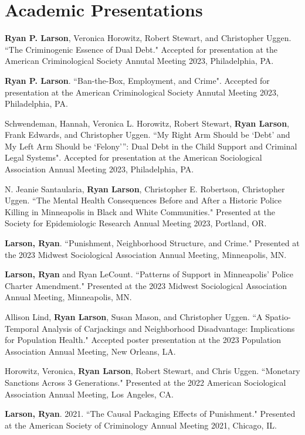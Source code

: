 \documentclass[letterpaper]{article}
\renewenvironment{itemize}{
  \begin{list}{}{
    \setlength{\leftmargin}{1.5em}
  }
}{
  \end{list}
}
\begin{document}
\section*{\textbf{Academic Presentations}}
\begin{itemize}
\item \textbf{Ryan P. Larson}, Veronica Horowitz, Robert Stewart, and Christopher Uggen. ``The Criminogenic Essence of Dual Debt." Accepted for presentation at the American Criminological Society Annutal Meeting 2023, Philadelphia, PA. 
\item \textbf{Ryan P. Larson}. ``Ban-the-Box, Employment, and Crime". Accepted for presentation at the American Criminological Society Annutal Meeting 2023, Philadelphia, PA. 
\item Schwendeman, Hannah, Veronica L. Horowitz, Robert Stewart, \textbf{Ryan Larson}, Frank Edwards, and Christopher Uggen. ``My Right Arm Should be ‘Debt’ and My Left Arm Should be ‘Felony’”:
Dual Debt in the Child Support and Criminal Legal Systems". Accepted for presentation at the American Sociological Association Annual Meeting 2023, Philadelphia, PA. 
\item N. Jeanie Santaularia, \textbf{Ryan Larson}, Christopher E. Robertson, Christopher Uggen. ``The Mental Health Consequences Before and After a Historic Police Killing in Minneapolis in Black and White Communities." Presented at the Society for Epidemiologic Research Annual Meeting 2023, Portland, OR.
\item \textbf{Larson, Ryan}.  ``Punishment, Neighborhood Structure, and Crime." Presented at the 2023 Midwest Sociological Association Annual Meeting, Minneapolis, MN. 
\item \textbf{Larson, Ryan} and Ryan LeCount.  ``Patterns of Support in Minneapolis’ Police Charter Amendment." Presented at the 2023 Midwest Sociological Association Annual Meeting, Minneapolis, MN. 
\item Allison Lind, \textbf{Ryan Larson}, Susan Mason, and Christopher Uggen. ``A Spatio-Temporal Analysis of Carjackings and Neighborhood Disadvantage: Implications for Population Health." Accepted poster presentation at the 2023 Population Association Annual Meeting, New Orleans, LA. 
\item Horowitz, Veronica, \textbf{Ryan Larson}, Robert Stewart, and Chris Uggen.  ``Monetary Sanctions Across 3 Generations." Presented at the 2022 American Sociological Association Annual Meeting, Los Angeles, CA. 
\item \textbf{Larson, Ryan}. 2021. ``The Causal Packaging Effects of Punishment." Presented at the American Society of Criminology Annual Meeting 2021, Chicago, IL. 

\end{itemize}
\end{document}
